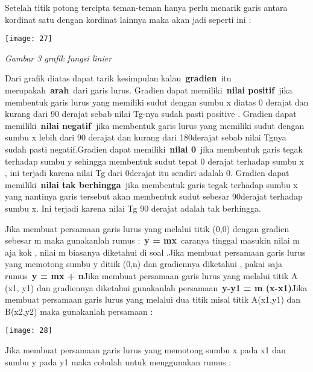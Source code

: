 \documentclass[11pt,fleqn]{book} %
\begin{document}
\noindent Setelah titik potong tercipta teman-teman hanya perlu menarik garis antara kordinat satu dengan kordinat lainnya maka akan jadi seperti ini :

\begin{center}
\noindent \texttt{[image: 27]}
\end{center}

\textit{Gambar 3 grafik fungsi linier}

\noindent 

\noindent Dari grafik diatas dapat tarik kesimpulan kalau~\textbf{gradien}~itu merupakah~\textbf{arah}~dari garis lurus. Gradien dapat memiliki~\textbf{nilai positif}~jika membentuk garis lurus yang memiliki sudut dengan sumbu x diatas 0 derajat dan kurang dari 90 derajat sebab nilai Tg-nya sudah pasti positive . Gradien dapat memiliki~\textbf{nilai negatif~}jika membentuk garis lurus yang memiliki sudut dengan sumbu x lebih dari 90 derajat dan kurang dari 180derajat sebab nilai Tgnya sudah pasti negatif.Gradien dapat memiliki~\textbf{nilai 0}~jika membentuk garis tegak terhadap sumbu y sehingga membentuk sudut tepat 0 derajat terhadap sumbu x , ini terjadi karena nilai Tg dari 0derajat itu sendiri adalah 0. Gradien dapat memiliki~\textbf{nilai tak berhingga}~jika membentuk garis tegak terhadap sumbu x yang nantinya garis tersebut akan membentuk sudut sebesar 90derajat terhadap sumbu x. Ini terjadi karena nilai Tg 90 derajat adalah tak berhingga.

\noindent Jika membuat persamaan garis lurus yang melalui titik (0,0) dengan gradien sebesar m maka gunakanlah rumus :~\textbf{y = mx}~caranya tinggal masukin nilai m aja kok , nilai m biasanya diketahui di soal .Jika membuat persamaan garis lurus yang memotong sumbu y ditiik (0,n) dan gradiennya diketahui , pakai saja rumus~\textbf{y = mx + n}Jika membuat persamaan garis lurus yang melalui titik A (x1, y1) dan gradiennya diketahui gunakanlah persamaan~\textbf{y-y1 = m (x-x1)}Jika membuat persamaan garis lurus yang melalui dua titik misal titik A(x1,y1) dan B(x2,y2) maka gunakanlah persamaan :

\begin{center}
\noindent \texttt{[image: 28]}
\end{center}

\noindent Jika membuat persamaan garis lurus yang memotong sumbu x pada x1 dan sumbu y pada y1 maka cobalah untuk menggunakan rumus :
\end{document}

